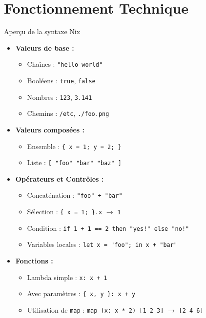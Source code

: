 \documentclass{beamer}
\begin{document}
\section{Fonctionnement Technique}

\begin{frame}[fragile]{Aperçu de la syntaxe Nix}
    \begin{itemize}
        \item \textbf{Valeurs de base :}
            \begin{itemize}
                \item Chaînes : \lstinline|"hello world"|
                \item Booléens : \lstinline|true|, \lstinline|false|
                \item Nombres : \lstinline|123|, \lstinline|3.141|
                \item Chemins : \lstinline|/etc|, \lstinline|./foo.png|
            \end{itemize}
        \item \textbf{Valeurs composées :}
            \begin{itemize}
                \item Ensemble : \lstinline|{ x = 1; y = 2; }|
                \item Liste : \lstinline|[ "foo" "bar" "baz" ]|
            \end{itemize}
        \item \textbf{Opérateurs et Contrôles :}
            \begin{itemize}
                \item Concaténation : \lstinline|"foo" + "bar"|
                \item Sélection : \lstinline|{ x = 1; }.x| $\rightarrow$ \lstinline|1|
                \item Condition : \lstinline|if 1 + 1 == 2 then "yes!" else "no!"|
                \item Variables locales : \lstinline|let x = "foo"; in x + "bar"|
            \end{itemize}
        \item \textbf{Fonctions :}
            \begin{itemize}
                \item Lambda simple : \lstinline|x: x + 1|
                \item Avec paramètres : \lstinline|{ x, y }: x + y|
                \item Utilisation de \lstinline|map| : \lstinline|map (x: x * 2) [1 2 3]| $\rightarrow$ \lstinline|[2 4 6]|
            \end{itemize}
    \end{itemize}
\end{frame}
\end{document}
